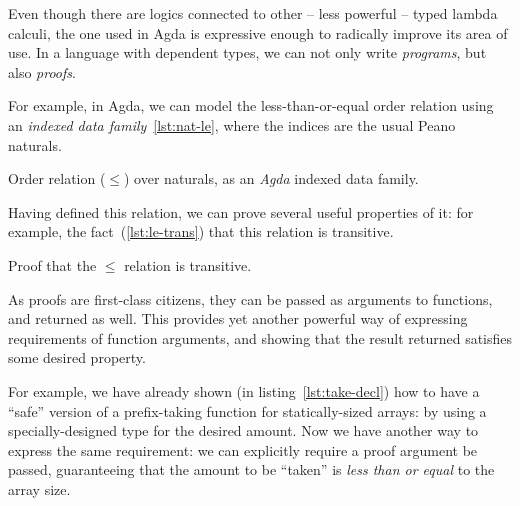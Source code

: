 
            Even though there are logics connected to other -- less powerful -- typed lambda calculi,
            the one used in Agda is expressive enough to radically improve its area of use.
            In a language with dependent types, we can not only write \emph{programs}, but also \emph{proofs}.

            For example, in Agda, we can model the less-than-or-equal order relation using an
            \emph{indexed data family}~\ref{lst:nat-le}, where the indices are the usual Peano naturals.

            \begin{listing}[h]
                \caption{Order relation ($\le$) over naturals, as an \emph{Agda} indexed data family.
                    \label{lst:nat-le}}
            \end{listing}

            Having defined this relation, we can prove several useful properties of it:
            for example, the fact~(\ref{lst:le-trans}) that this relation is transitive.

            \begin{listing}[h]
                \caption{Proof that the $\le$ relation is transitive. \label{lst:le-trans}}
            \end{listing}

            As proofs are first-class citizens, they can be passed as arguments to functions,
            and returned as well.
            This provides yet another powerful way of expressing requirements of function arguments,
            and showing that the result returned satisfies some desired property.

            For example, we have already shown (in listing~\ref{lst:take-decl}) how to have a ``safe''
            version of a prefix-taking function for statically-sized arrays:
            by using a specially-designed type for the desired amount.
            Now we have another way to express the same requirement:
            we can explicitly require a proof argument be passed,
            guaranteeing that the amount to be ``taken'' is \emph{less than or equal} to the array size.

            \begin{listing}[h]
            \end{listing}

